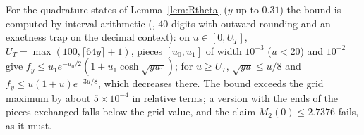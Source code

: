 For the quadrature states of Lemma~\ref{lem:Rtheta} ($y$ up to $0.31$) the bound is computed by interval arithmetic (, $40$ digits with outward rounding and an exactness trap on the decimal context): on $u\in[0,U_T]$, $U_T=\max(100,\lceil64y\rceil+1)$, pieces $[u_0,u_1]$ of width $10^{-3}$ ($u<20$) and $10^{-2}$ give $f_y\le u_1e^{-u_0/2}(1+u_1\cosh\sqrt{yu_1})$; for $u\ge U_T$, $\sqrt{yu}\le u/8$ and $f_y\le u(1+u)e^{-3u/8}$, which decreases there.
The bound exceeds the grid maximum by about $5\times10^{-4}$ in relative terms; a version with the ends of the pieces exchanged falls below the grid value, and the claim $M_2(0)\le2.7376$ fails, as it must.
